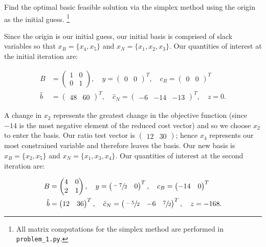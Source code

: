 Find the optimal basic feasible solution via the simplex method using the origin as the initial guess. \footnote{
  All matrix computations for the simplex method are performed in \texttt{problem\_1.py}.
}

\begin{solution}
  Since the origin is our initial guess, our initial basis is comprised of slack variables so that 
  $x_B = \{ x_4, x_5 \}$ and $x_N = \{ x_1, x_2, x_3 \}$. Our quantities of interest at the initial iteration are:


  \begin{align*}
    B &= \begin{pmatrix}
      1 & 0 \\
      0 & 1
    \end{pmatrix}, \quad y = \begin{pmatrix}
      0 & 0
    \end{pmatrix}^T, \quad c_B = \begin{pmatrix}
      0 & 0
    \end{pmatrix}^T \\
    \hat{b} &= \begin{pmatrix}
      48 & 60
    \end{pmatrix}^T, \quad \hat{c}_N = \begin{pmatrix}
      -6 & -14 & -13
    \end{pmatrix}^T, \quad z = 0.
  \end{align*}

  A change in $x_2$ represents the greatest change in the objective function (since $-14$ is the most negative element of
  the reduced cost vector) and so we choose $x_2$ to enter the basis. Our ratio test vector is 
  $\begin{pmatrix} 12 & 30 \end{pmatrix}$; hence $x_4$ represents our most constrained variable and therefore leaves 
  the basis. Our new basis is $x_B = \{ x_2, x_5 \}$ and $x_N = \{ x_1, x_3, x_4 \}$. Our quantities of interest at the
  second iteration are:

  \begin{align*}
    B &= \begin{pmatrix}
      4 & 0 \\
      2 & 1
    \end{pmatrix}, \quad y = \begin{pmatrix}
      \sfrac{-7}{2} & 0
    \end{pmatrix}^T, \quad c_B = \begin{pmatrix}
      -14 & 0
    \end{pmatrix}^T \\
    \hat{b} &= \begin{pmatrix}
      12 & 36
    \end{pmatrix}^T, \quad \hat{c}_N = \begin{pmatrix}
      \sfrac{-5}{2} & -6 & \sfrac{7}{2}
    \end{pmatrix}^T, \quad z = -168.
  \end{align*}


\end{solution}
